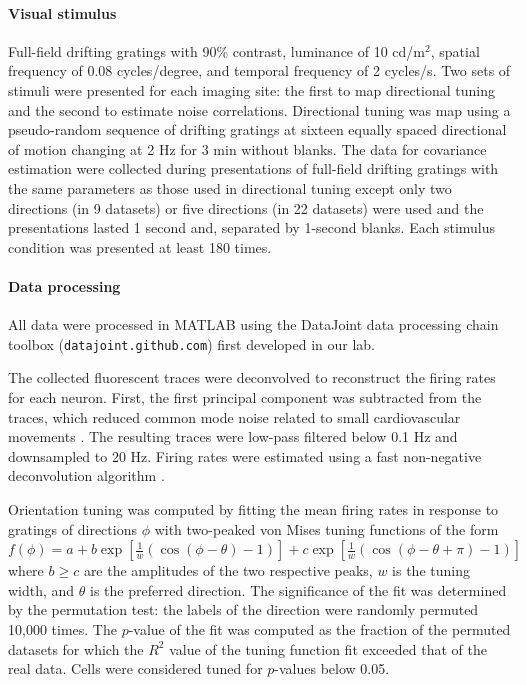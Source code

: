 \documentclass[10pt]{article}
\begin{document}
\paragraph{Visual stimulus}
Full-field drifting gratings with 90\% contrast, luminance of 10 cd/m$^2$, spatial frequency of 0.08 cycles/degree, and temporal frequency of 2 cycles/s. Two sets of stimuli were presented for each imaging site: the first to map directional tuning and the second to estimate noise correlations. Directional tuning was map using a pseudo-random sequence of drifting gratings at sixteen equally spaced directional of motion changing at 2 Hz for 3 min without blanks. The data for covariance estimation were collected during presentations of full-field drifting gratings with the same parameters as those used in directional tuning except only two directions (in 9 datasets) or five directions (in 22 datasets) were used and the presentations lasted 1 second and, separated by 1-second blanks.  Each stimulus condition was presented at least 180 times. 
\paragraph{Data processing}
All data were processed in MATLAB using the DataJoint data processing chain toolbox ({\tt datajoint.github.com}) first developed in our lab. 

The collected fluorescent traces were deconvolved to reconstruct the firing rates for each neuron. First, the first principal component was subtracted from the traces, which reduced common mode noise related to small cardiovascular movements \cite{Cotton:2013}. The resulting traces were low-pass filtered below 0.1 Hz and downsampled to 20 Hz. Firing rates were estimated using a fast non-negative deconvolution algorithm \cite{Vogelstein:2010}.

Orientation tuning was computed by fitting the mean firing rates in response to gratings of directions $\phi$ with two-peaked von Mises tuning functions of the form $f(\phi)=a + b\exp\left[\frac 1 w(\cos(\phi-\theta)-1) \right] + c\exp\left[\frac 1 w(\cos(\phi-\theta+\pi)-1) \right]$ where $b\ge c$ are the amplitudes of the two respective peaks, $w$ is the tuning width, and  $\theta$ is the preferred direction. The significance of the fit was determined by the permutation test: the labels of the direction were randomly permuted 10,000 times.  The $p$-value of the fit was computed as the fraction of the permuted datasets for which the $R^2$ value of the tuning function fit exceeded that of the real data.  Cells were considered tuned for $p$-values below 0.05.
\end{document}
